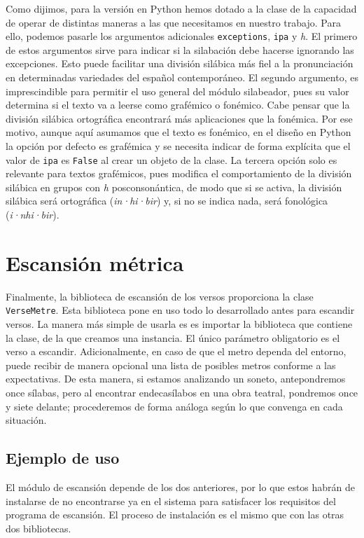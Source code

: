 Como dijimos, para la versión en Python hemos dotado a la clase de la capacidad de operar de distintas maneras a las que necesitamos en nuestro trabajo. Para ello, podemos pasarle  los argumentos adicionales \texttt{exceptions}, \texttt{ipa} y \textit{h}. El primero de estos argumentos sirve para indicar si la silabación debe hacerse ignorando las excepciones. Esto puede facilitar una división silábica más fiel a la pronunciación en determinadas variedades del español contemporáneo. El segundo argumento, es imprescindible para permitir el uso general del módulo silabeador, pues su valor determina si el texto va a leerse como grafémico o fonémico. Cabe pensar que la división silábica ortográfica encontrará más aplicaciones que la fonémica. Por ese motivo, aunque aquí asumamos que el texto es fonémico, en el diseño en Python la opción por defecto es grafémica y se necesita indicar de forma explícita que el valor de \texttt{ipa} es \texttt{False} al crear un objeto de la clase.  La tercera opción solo es relevante para textos grafémicos, pues modifica el comportamiento de la división silábica en grupos con \textit{h} posconsonántica, de modo que si se activa, la división silábica será ortográfica (\textit{in·hi·bir}) y, si no se indica nada, será fonológica (\textit{i·nhi·bir}).

\section*{Escansión métrica}
 Finalmente, la biblioteca de escansión de los versos proporciona la clase \texttt{VerseMetre}. Esta biblioteca pone en uso todo lo desarrollado antes para escandir versos. La manera más simple de usarla es es importar la biblioteca que contiene la clase, de la que creamos una instancia. El único parámetro obligatorio es el verso a escandir. Adicionalmente, en caso de que el metro dependa del entorno, puede recibir de manera opcional una lista de posibles metros conforme a las expectativas. De esta manera, si estamos analizando un soneto, antepondremos once sílabas, pero al encontrar endecasílabos en una obra teatral, pondremos once y siete delante; procederemos de forma análoga según lo que convenga en cada situación. 

\subsection*{Ejemplo de uso}
El módulo de escansión depende de los dos anteriores, por lo que estos habrán de instalarse de no encontrarse ya en el sistema para satisfacer los requisitos del programa de escansión. El proceso de instalación es el mismo que con las otras dos bibliotecas.

